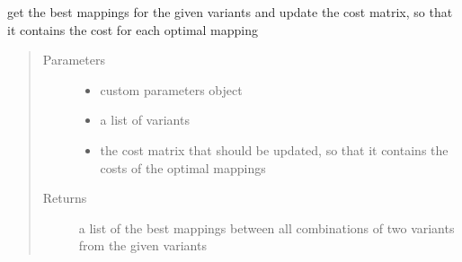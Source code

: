 \documentclass[letterpaper,10pt,english]{sphinxmanual}
\begin{document}

\begin{fulllineitems}
\label{\detokenize{cost function:costFunction.cost.bestMappings}}
get the best mappings for the given variants and update the cost matrix, so that it contains the cost for each optimal mapping
\begin{quote}\begin{description}
\item[{Parameters}] \leavevmode\begin{itemize}
\item {} 
 \textendash{} custom parameters object

\item {} 
 \textendash{} a list of variants

\item {} 
 \textendash{} the cost matrix that should be updated, so that it contains the costs of the optimal mappings

\end{itemize}

\item[{Returns}] \leavevmode
a list of the best mappings between all combinations of two variants from the given variants

\end{description}\end{quote}

\end{fulllineitems}

\end{document}
